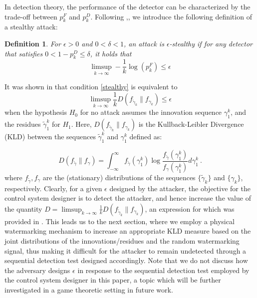 \documentclass[journal,10pt]{IEEEtran}
\newtheorem{defi}{Definition}
\begin{document}
In detection theory, the performance of the detector can be characterized by the trade-off between $p_{k}^{F}$ and $p_{k}^{D}$. Following \cite{stealthyattack},\cite{enoch}, we introduce the following definition of a stealthy attack:

\vspace{.2cm}
\begin{defi}
For $\epsilon>0$ and $0<\delta<1$, an attack is $\epsilon$-stealthy
if for any detector that satisfies $0<1-p_{k}^{D}\leq\delta$, it holds that
\begin{equation}
\limsup_{k\rightarrow\infty}-\frac{1}{k}\log(p_{k}^{F})\leq\epsilon\label{stealthy}
\end{equation}
\end{defi}

It was shown in \cite{enoch} that condition \eqref{stealthy} is
equivalent to
\begin{equation}
\limsup_{k\rightarrow\infty} \frac{1}{k}D(f_{\widetilde{\gamma}_{k}}\|f_{\gamma_{k}})\leq\epsilon
\end{equation}
when the hypothesis $H_0$ for no attack assumes the innovation sequence $\gamma_{1}^{k}$, and the residues
$\widetilde{\gamma}_{1}^{k}$ for $H_1$.   Here, $D(f_{\widetilde{\gamma}_{k}}\| f_{\gamma_{k}})$
is the Kullback-Leibler Divergence (KLD) between the sequences
$\widetilde{\gamma}_{1}^{k}$ and $\gamma_{1}^{k}$ defined as:

\begin{equation}
D(f_{\widetilde{\gamma}} \| f_{\gamma})=\int_{-\infty}^{\infty}f_{\widetilde{\gamma}}(\gamma_{1}^{k})\log\frac{f_{\widetilde{\gamma}}(\gamma_{1}^{k})}{f_{\gamma}(\gamma_{1}^{k})}d\gamma_{1}^{k}\ .
\end{equation}
where $f_{\widetilde{\gamma}}, f_{\gamma}$ are the (stationary) distributions of the sequences 
$\{\widetilde{\gamma}_{k}\}$ and $\{\gamma_{k}\}$, respectively.  Clearly, for a given $\epsilon$ designed by the attacker, 
the objective for the control system designer is to detect the attacker, and hence increase the value of the 
quantity $D = \limsup_{k\rightarrow\infty} \frac{1}{k}D(f_{\widetilde{\gamma}_{k}}\|f_{\gamma_{k}})$, an expression for which was provided in \cite{enoch}. This leads us to the next section, where we employ a physical watermarking mechanism to increase an appropriate KLD measure based on the joint distributions of the innovations/residues and the random watermarking signal, thus making it difficult for the attacker to remain undetected through a sequential detection test designed accordingly. Note that we do not discuss how the adversary designs $\epsilon$ in response to the sequential detection test employed by the control system designer in this paper, a topic which will be further investigated in a game theoretic setting in future work.
\end{document}
